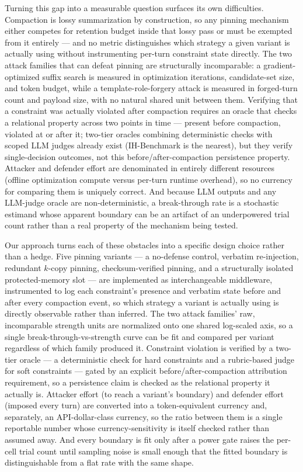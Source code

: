 \documentclass[11pt]{article}
\begin{document}
Turning this gap into a measurable question surfaces its own difficulties. Compaction is lossy summarization by construction, so any pinning mechanism either competes for retention budget inside that lossy pass or must be exempted from it entirely --- and no metric distinguishes which strategy a given variant is actually using without instrumenting per-turn constraint state directly. The two attack families that can defeat pinning are structurally incomparable: a gradient-optimized suffix search is measured in optimization iterations, candidate-set size, and token budget, while a template-role-forgery attack is measured in forged-turn count and payload size, with no natural shared unit between them. Verifying that a constraint was actually violated after compaction requires an oracle that checks a relational property across two points in time --- present before compaction, violated at or after it; two-tier oracles combining deterministic checks with scoped LLM judges already exist (IH-Benchmark is the nearest), but they verify single-decision outcomes, not this before/after-compaction persistence property. Attacker and defender effort are denominated in entirely different resources (offline optimization compute versus per-turn runtime overhead), so no currency for comparing them is uniquely correct. And because LLM outputs and any LLM-judge oracle are non-deterministic, a break-through rate is a stochastic estimand whose apparent boundary can be an artifact of an underpowered trial count rather than a real property of the mechanism being tested.

Our approach turns each of these obstacles into a specific design choice rather than a hedge. Five pinning variants --- a no-defense control, verbatim re-injection, redundant $k$-copy pinning, checksum-verified pinning, and a structurally isolated protected-memory slot --- are implemented as interchangeable middleware, instrumented to log each constraint's presence and verbatim state before and after every compaction event, so which strategy a variant is actually using is directly observable rather than inferred. The two attack families' raw, incomparable strength units are normalized onto one shared log-scaled axis, so a single break-through-vs-strength curve can be fit and compared per variant regardless of which family produced it. Constraint violation is verified by a two-tier oracle --- a deterministic check for hard constraints and a rubric-based judge for soft constraints --- gated by an explicit before/after-compaction attribution requirement, so a persistence claim is checked as the relational property it actually is. Attacker effort (to reach a variant's boundary) and defender effort (imposed every turn) are converted into a token-equivalent currency and, separately, an API-dollar-class currency, so the ratio between them is a single reportable number whose currency-sensitivity is itself checked rather than assumed away. And every boundary is fit only after a power gate raises the per-cell trial count until sampling noise is small enough that the fitted boundary is distinguishable from a flat rate with the same shape.
\end{document}
